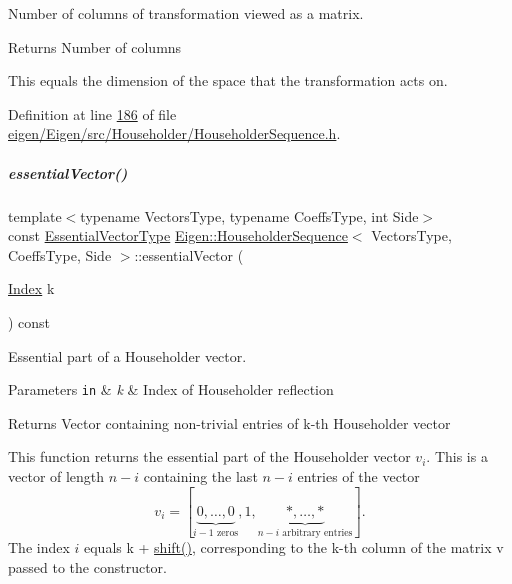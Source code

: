 Number of columns of transformation viewed as a matrix. 

\begin{DoxyReturn}{Returns}
Number of columns
\end{DoxyReturn}
This equals the dimension of the space that the transformation acts on. 

Definition at line \hyperlink{eigen_2_eigen_2src_2_householder_2_householder_sequence_8h_source_l00186}{186} of file \hyperlink{eigen_2_eigen_2src_2_householder_2_householder_sequence_8h_source}{eigen/\+Eigen/src/\+Householder/\+Householder\+Sequence.\+h}.

\mbox{\label{group___householder___module_ac91cf37b0cbea9e504c89e021fd289ba}} 
\subparagraph{\texorpdfstring{essential\+Vector()}{essentialVector()}\hspace{0.1cm}{\footnotesize\ttfamily [1/2]}}
{\footnotesize\ttfamily template$<$typename Vectors\+Type, typename Coeffs\+Type, int Side$>$ \\
const \hyperlink{group___core___module_class_eigen_1_1_block}{Essential\+Vector\+Type} \hyperlink{group___householder___module_class_eigen_1_1_householder_sequence}{Eigen\+::\+Householder\+Sequence}$<$ Vectors\+Type, Coeffs\+Type, Side $>$\+::essential\+Vector (\begin{DoxyParamCaption}\item[{\hyperlink{group___core___module_a554f30542cc2316add4b1ea0a492ff02}{Index}}]{k }\end{DoxyParamCaption}) const\hspace{0.3cm}{\ttfamily [inline]}}



Essential part of a Householder vector. 


\begin{DoxyParams}[1]{Parameters}
\mbox{\tt in}  & {\em k} & Index of Householder reflection \\
\hline
\end{DoxyParams}
\begin{DoxyReturn}{Returns}
Vector containing non-\/trivial entries of k-\/th Householder vector
\end{DoxyReturn}
This function returns the essential part of the Householder vector $ v_i $. This is a vector of length $ n-i $ containing the last $ n-i $ entries of the vector \[ v_i = [\underbrace{0, \ldots, 0}_{i-1\mbox{ zeros}}, 1, \underbrace{*, \ldots,*}_{n-i\mbox{ arbitrary entries}} ]. \] The index $ i $ equals {\ttfamily k} + \hyperlink{group___householder___module_a34482bfad5563fd8a8a4264db76ac917}{shift()}, corresponding to the k-\/th column of the matrix {\ttfamily v} passed to the constructor.

